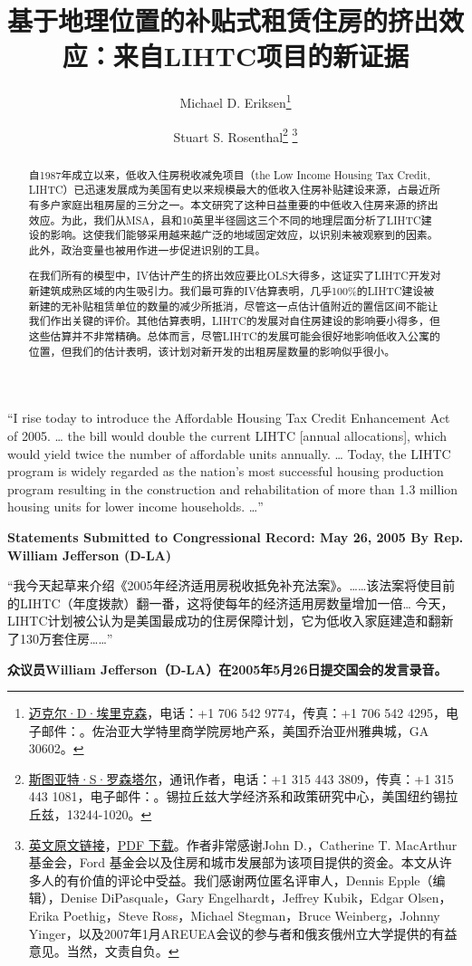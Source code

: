 \documentclass[lang=cn,11pt,a4paper]{paper}
\title{基于地理位置的补贴式租赁住房的挤出效应：来自LIHTC项目的新证据}
\author{Michael D. Eriksen\thanks{\href{http://www.eriksen.myweb.uga.edu}{迈克尔·D·埃里克森}，电话：+1 706 542 9774，传真：+1 706 542 4295，电子邮件：\email{eriksen@terry.uga.edu}。佐治亚大学特里商学院房地产系，美国乔治亚州雅典城，GA 30602。} \and Stuart S. Rosenthal\thanks{\href{http://www.faculty.maxwell.syr.edu/rosenthal}{斯图亚特·S·罗森塔尔}，通讯作者，电话：+1 315 443 3809，传真：+1 315 443 1081，电子邮件：\email{ssrosent@maxwell.syr.edu}。锡拉丘兹大学经济系和政策研究中心，美国纽约锡拉丘兹，13244-1020。}\; \thanks{\href{https://www.sciencedirect.com/science/article/pii/S0047272710000885}{\faLink\;英文原文链接}，\href{https://sci-hub.tw/10.1016/j.jpubeco.2010.07.002}{\faFilePdf[regular]\;PDF 下载}。作者非常感谢John D.，Catherine T. MacArthur 基金会，Ford 基金会以及住房和城市发展部为该项目提供的资金。本文从许多人的有价值的评论中受益。我们感谢两位匿名评审人，Dennis Epple（编辑），Denise DiPasquale，Gary Engelhardt，Jeffrey Kubik，Edgar Olsen，Erika Poethig，Steve Ross，Michael Stegman，Bruce Weinberg，Johnny Yinger，以及2007年1月AREUEA会议的参与者和俄亥俄州立大学提供的有益意见。当然，文责自负。}}
\date{\zhtoday}
\begin{document}
\maketitle

\begin{abstract}
  \hspace{2\ccwd}自1987年成立以来，低收入住房税收减免项目（the Low Income Housing Tax Credit, LIHTC）已迅速发展成为美国有史以来规模最大的低收入住房补贴建设来源，占最近所有多户家庭出租房屋的三分之一。本文研究了这种日益重要的中低收入住房来源的挤出效应。为此，我们从MSA，县和10英里半径圆这三个不同的地理层面分析了LIHTC建设的影响。这使我们能够采用越来越广泛的地域固定效应，以识别未被观察到的因素。此外，政治变量也被用作进一步促进识别的工具。
  
  \!在我们所有的模型中，IV估计产生的挤出效应要比OLS大得多，这证实了LIHTC开发对新建筑成熟区域的内生吸引力。我们最可靠的IV估算表明，几乎100\%的LIHTC建设被新建的无补贴租赁单位的数量的减少所抵消，尽管这一点估计值附近的置信区间不能让我们作出关键的评价。其他估算表明，LIHTC的发展对自住房建设的影响要小得多，但这些估算并不非常精确。总体而言，尽管LIHTC的发展可能会很好地影响低收入公寓的位置，但我们的估计表明，该计划对新开发的出租房屋数量的影响似乎很小。

\end{abstract}
\vspace{10pt}

\begin{tcolorbox}[
	colback=yellow!10!white,
  colframe=red!30!black,
  fontupper = \itshape,
]
“I rise today to introduce the Affordable Housing Tax Credit Enhancement Act of 2005. … the bill would double the current LIHTC [annual allocations], which would yield twice the number of affordable units annually. … Today, the LIHTC program is widely regarded as the nation's most successful housing production program resulting in the construction and rehabilitation of more than 1.3 million housing units for lower income households. …”
\vspace{5pt}

\textbf{Statements Submitted to Congressional Record: May 26, 2005 By Rep. William Jefferson (D-LA)}

\tcblower

“我今天起草来介绍《2005年经济适用房税收抵免补充法案》。……该法案将使目前的LIHTC（年度拨款）翻一番，这将使每年的经济适用房数量增加一倍… 今天，LIHTC计划被公认为是美国最成功的住房保障计划，它为低收入家庭建造和翻新了130万套住房……”
\vspace{5pt}

\textbf{众议员William Jefferson（D-LA）在2005年5月26日提交国会的发言录音。}

\end{tcolorbox}
\vspace{10pt}
\end{document}
